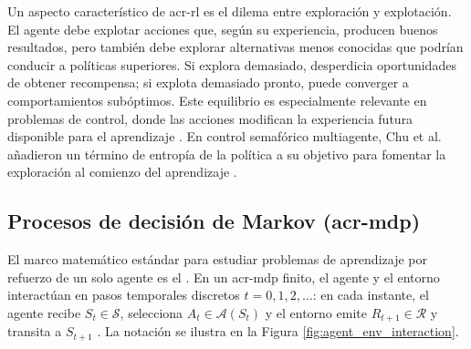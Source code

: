 Un aspecto característico de \acrshort{acr-rl} es el dilema entre exploración y explotación. El agente debe explotar acciones que, según su experiencia, producen buenos resultados, pero también debe explorar alternativas menos conocidas que podrían conducir a políticas superiores. Si explora demasiado, desperdicia oportunidades de obtener recompensa; si explota demasiado pronto, puede converger a comportamientos subóptimos. Este equilibrio es especialmente relevante en problemas de control, donde las acciones modifican la experiencia futura disponible para el aprendizaje \cite{suttonRL}. En control semafórico multiagente, Chu et al. añadieron un término de entropía de la política a su objetivo para fomentar la exploración al comienzo del aprendizaje \cite{Chu2019}.

\subsection[Procesos de decisión de Markov (MDP)]{Procesos de decisión de Markov (\acrshort{acr-mdp})}

El marco matemático estándar para estudiar problemas de aprendizaje por refuerzo de un solo agente es el . En un \gls{acr-mdp} finito, el agente y el entorno interactúan en pasos temporales discretos $t = 0, 1, 2, \dots$: en cada instante, el agente recibe $S_t \in \mathcal{S}$, selecciona $A_t \in \mathcal{A}(S_t)$ y el entorno emite $R_{t+1} \in \mathcal{R}$ y transita a $S_{t+1}$ \cite{liang2025marlreview}. La notación se ilustra en la Figura \ref{fig:agent_env_interaction}.

